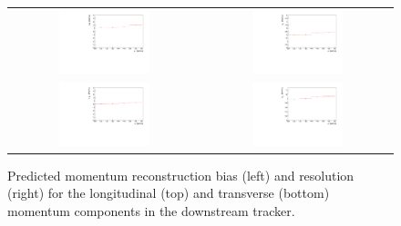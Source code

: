 \begin{figure}[ht]
	\centering
    \begin{tabular}{cc}
	    \includegraphics[width=0.5\textwidth]{downstream_p_bias_p.pdf} &	
        \includegraphics[width=0.5\textwidth]{downstream_p_resolution_p.pdf} \\
        \includegraphics[width=0.5\textwidth]{downstream_pt_bias_p.pdf} &
        \includegraphics[width=0.5\textwidth]{downstream_pt_resolution_p.pdf}
    \end{tabular}
	\caption{\label{trackers:performance:resolutions:down}Predicted momentum reconstruction bias (left) and resolution (right) for the longitudinal (top) and transverse (bottom) momentum components in the downstream tracker.}
\end{figure}


